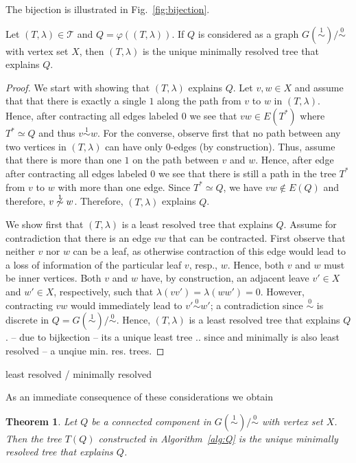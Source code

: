 \documentclass[smallextended]{svjour3}
\newcommand{\rev}[1]{\begingroup\color{blue}#1\endgroup}
\newcommand{\TODO}[1]{\begingroup\color{red}#1\endgroup}
\newcommand{\Ro}{\mathrel{\overset{0}{\sim}}}
\newcommand{\Rl}{\mathrel{\overset{1}{\sim}}}
\newtheorem{thm}{Theorem}
\begin{document}
\rev{The bijection is illustrated in Fig.~\ref{fig:bijection}.}


\rev{
\begin{lemma}
  Let $(T,\lambda) \in \mathcal{T}$ and $Q= \varphi((T,\lambda))$.  If $Q$
  is considered as a graph \mbox{$G(\Rl)/\Ro$} with vertex set $X$, then
  $(T,\lambda)$ is the unique minimally resolved tree that explains $Q$.
\end{lemma}
\begin{proof}
	We start with showing that 	$(T,\lambda)$  explains $Q$. 
	Let $v,w\in X$ and assume that that there is exactly a single $1$
	along the path from $v$ to $w$ in $(T,\lambda)$. 
	Hence, after contracting all edges labeled $0$ we see 
	that $vw\in E(T^*)$ where $T^* \simeq Q$	 and
	thus $v\Rl w$. 
	For the converse, observe first that no path between any two vertices 
	in $(T,\lambda)$ can have only 0-edges (by construction). 
	Thus, assume that there is more than one $1$
	on the path between $v$ and $w$. Hence, after edge
	after contracting all edges labeled $0$ we see that there is
	still a path in the tree $T^*$ from  $v$ to $w$
	with more than one edge. Since $T^* \simeq Q$, we have 
	$vw\not \in E(Q)$ and therefore, $v\not\Rl w$. 
	Therefore, $(T,\lambda)$ explains $Q$. 

	We show first that 	 $(T,\lambda)$ is a least resolved  
	tree that explains $Q$. Assume for contradiction that there is 
	an edge $vw$ that can be contracted. First observe that neither
	$v$ nor $w$ can be a leaf, as otherwise contraction of this edge
	would lead to a loss of information of the particular leaf $v$, resp., $w$. 
	Hence, both $v$ and $w$ must be inner vertices. 
	Both $v$ and $w$ have, by construction, an adjacent leave $v'\in X$ and $w'\in X$, 
	respectively, such that $\lambda(vv') = \lambda(ww') = 0$. However, 
	contracting  $vw$ would immediately lead to $v'\Ro w'$; a contradiction 
	since $\Ro$ is discrete in $Q=G(\Rl)/\Ro$. 
	Hence, $(T,\lambda)$ is a least resolved  
	tree that explains $Q$. 
 -- due to bijkection -- its a unique least tree .. since 
	and minimally is also least resolved -- a unqiue min. res. trees. 
\end{proof}	
}

\TODO{least resolved / minimally resolved} 

\rev{As an immediate consequence of these considerations we obtain}
\begin{thm}
  Let $Q$ be a connected component in $G(\Rl)/\Ro$ with vertex set $X$.
  Then the tree $T(Q)$ constructed in Algorithm~\ref{alg:Q} is the unique
  \rev{minimally} resolved tree that explains $Q$. 
  \label{thm:connComp}
\end{thm}
\end{document}
